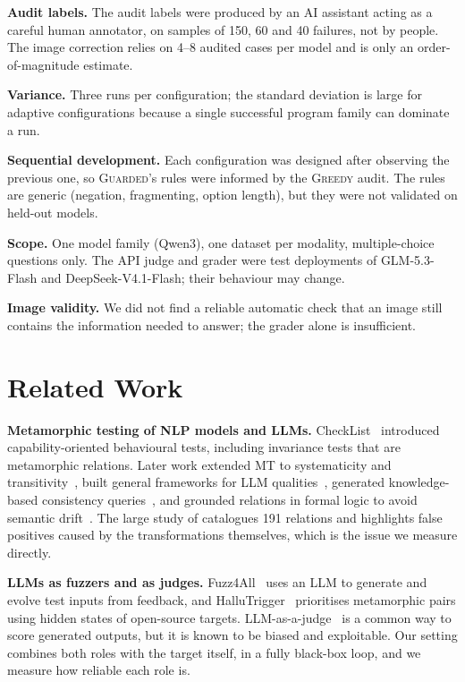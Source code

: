 \documentclass[sigconf]{acmart}
\newcommand{\BOLD}{\textsc{Greedy}}
\newcommand{\BR}{\textsc{Guarded}}
\begin{document}
\textbf{Audit labels.} The audit labels were produced by an AI assistant acting as a careful human annotator, on
samples of 150, 60 and 40 failures, not by people. The image correction relies on 4--8 audited cases per model and is
only an order-of-magnitude estimate.

\textbf{Variance.} Three runs per configuration; the standard deviation is large for adaptive configurations
because a single successful program family can dominate a run.

\textbf{Sequential development.} Each configuration was designed after observing the previous one, so \BR{}'s rules
were informed by the \BOLD{} audit. The rules are generic (negation, fragmenting, option length), but they were not
validated on held-out models.

\textbf{Scope.} One model family (Qwen3), one dataset per modality, multiple-choice questions only. The API judge and
grader were test deployments of GLM-5.3-Flash and DeepSeek-V4.1-Flash; their behaviour may change.

\textbf{Image validity.} We did not find a reliable automatic check that an image still contains the information
needed to answer; the grader alone is insufficient.

\section{Related Work}

\textbf{Metamorphic testing of NLP models and LLMs.} CheckList~\cite{ribeiro2020checklist} introduced
capability-oriented behavioural tests, including invariance tests that are metamorphic relations. Later work extended MT
to systematicity and transitivity~\cite{manino2022systematicity}, built general frameworks for LLM
qualities~\cite{hyun2023metal}, generated knowledge-based consistency queries~\cite{rajan2024kontest}, and grounded
relations in formal logic to avoid semantic drift~\cite{zhou2026lgmt}. The large study of \citet{cho2025mt}
catalogues 191 relations and highlights false positives caused by the transformations themselves, which is the issue we
measure directly.

\textbf{LLMs as fuzzers and as judges.} Fuzz4All~\cite{xia2024fuzz4all} uses an LLM to generate and evolve test
inputs from feedback, and HalluTrigger~\cite{liu2026hallutrigger} prioritises metamorphic pairs using hidden states of
open-source targets. LLM-as-a-judge~\cite{zheng2023judge} is a common way to score generated outputs, but it is known
to be biased and exploitable. Our setting combines both roles with the target itself, in a fully black-box loop, and we
measure how reliable each role is.
\end{document}
